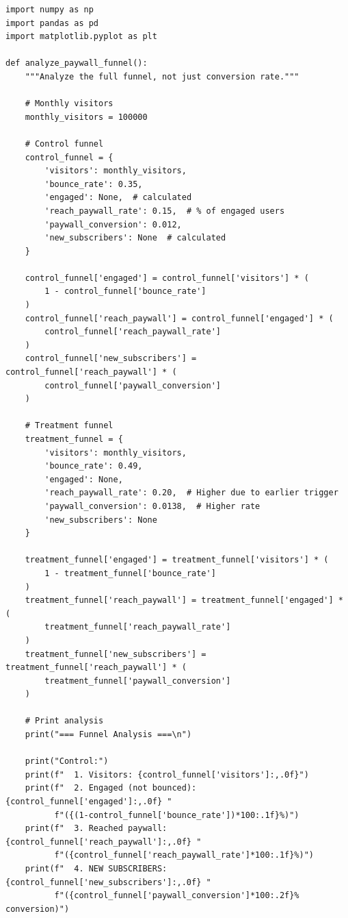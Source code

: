 \lstset{language=Python, caption=Analyzing Funnel Effects}
\begin{lstlisting}
import numpy as np
import pandas as pd
import matplotlib.pyplot as plt

def analyze_paywall_funnel():
    """Analyze the full funnel, not just conversion rate."""

    # Monthly visitors
    monthly_visitors = 100000

    # Control funnel
    control_funnel = {
        'visitors': monthly_visitors,
        'bounce_rate': 0.35,
        'engaged': None,  # calculated
        'reach_paywall_rate': 0.15,  # % of engaged users
        'paywall_conversion': 0.012,
        'new_subscribers': None  # calculated
    }

    control_funnel['engaged'] = control_funnel['visitors'] * (
        1 - control_funnel['bounce_rate']
    )
    control_funnel['reach_paywall'] = control_funnel['engaged'] * (
        control_funnel['reach_paywall_rate']
    )
    control_funnel['new_subscribers'] = control_funnel['reach_paywall'] * (
        control_funnel['paywall_conversion']
    )

    # Treatment funnel
    treatment_funnel = {
        'visitors': monthly_visitors,
        'bounce_rate': 0.49,
        'engaged': None,
        'reach_paywall_rate': 0.20,  # Higher due to earlier trigger
        'paywall_conversion': 0.0138,  # Higher rate
        'new_subscribers': None
    }

    treatment_funnel['engaged'] = treatment_funnel['visitors'] * (
        1 - treatment_funnel['bounce_rate']
    )
    treatment_funnel['reach_paywall'] = treatment_funnel['engaged'] * (
        treatment_funnel['reach_paywall_rate']
    )
    treatment_funnel['new_subscribers'] = treatment_funnel['reach_paywall'] * (
        treatment_funnel['paywall_conversion']
    )

    # Print analysis
    print("=== Funnel Analysis ===\n")

    print("Control:")
    print(f"  1. Visitors: {control_funnel['visitors']:,.0f}")
    print(f"  2. Engaged (not bounced): {control_funnel['engaged']:,.0f} "
          f"({(1-control_funnel['bounce_rate'])*100:.1f}%)")
    print(f"  3. Reached paywall: {control_funnel['reach_paywall']:,.0f} "
          f"({control_funnel['reach_paywall_rate']*100:.1f}%)")
    print(f"  4. NEW SUBSCRIBERS: {control_funnel['new_subscribers']:,.0f} "
          f"({control_funnel['paywall_conversion']*100:.2f}% conversion)")


\end{lstlisting}

